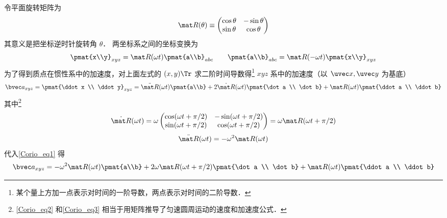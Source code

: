 令平面旋转矩阵为%
\begin{equation}
\mat R(\theta) \equiv \begin{pmatrix}
\cos \theta & - \sin \theta \\
\sin \theta & \cos \theta
\end{pmatrix}
\end{equation}
其意义是把坐标逆时针旋转角 $\theta$． 两坐标系之间的坐标变换为
\begin{equation}
\pmat{x\\y}_{xyz} = \mat R(\omega t) \pmat{a\\b}_{abc}
\qquad
\pmat{a\\b}_{abc} = \mat R(-\omega t) \pmat{x\\y}_{xyz}
\end{equation}
为了得到质点在惯性系中的加速度，对上面左式的 $(x,y)\Tr$ 求二阶时间导数得\footnote{某个量上方加一点表示对时间的一阶导数，两点表示对时间的二阶导数．} $xyz$ 系中的加速度（以 $\uvec x, \uvec y$ 为基底）
\begin{equation}\label{Corio_eq1}
\bvec a_{xyz} = \pmat{\ddot x \\ \ddot y}_{xyz} = 
\ddot{\mat R}(\omega t) \pmat{a\\b} + 2\dot{\mat R} (\omega t) \pmat{\dot a \\ \dot b} + \mat R(\omega t)\pmat{\ddot a \\ \ddot b}
\end{equation}
其中\footnote{\autoref{Corio_eq2} 和\autoref{Corio_eq3} 相当于用矩阵推导了匀速圆周运动的速度和加速度公式．}
\begin{equation}\label{Corio_eq2}
\dot{\mat R}(\omega t) = \omega \begin{pmatrix}
\cos(\omega t + \pi /2) &  - \sin(\omega t + \pi /2)\\
\sin(\omega t + \pi /2) & \cos(\omega t + \pi /2)
\end{pmatrix}
= \omega \mat R(\omega t + \pi /2)
\end{equation}
\begin{equation}\label{Corio_eq3}
\ddot{\mat R} (\omega t)  =  - \omega ^2 \mat R (\omega t)
\end{equation}
 代入\autoref{Corio_eq1} 得
\begin{equation}
\bvec a_{xyz} =
- \omega ^2 \mat R(\omega t)\pmat{a\\b} + 2\omega \mat R(\omega t + \pi /2)\pmat{\dot a \\ \dot b} + \mat R(\omega t)\pmat{\ddot a \\ \ddot b}
\end{equation}

